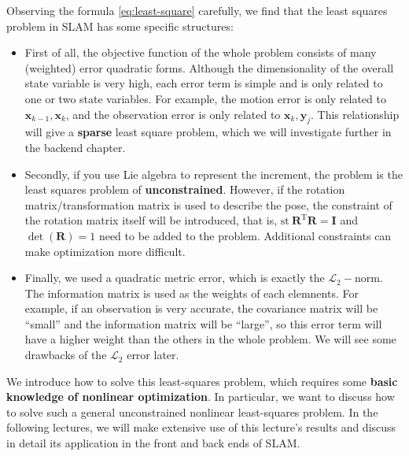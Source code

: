 Observing the formula \eqref{eq:least-square} carefully, we find that the least squares problem in SLAM has some specific structures:

\begin{itemize}
	\item First of all, the objective function of the whole problem consists of many (weighted) error quadratic forms. Although the dimensionality of the overall state variable is very high, each error term is simple and is only related to one or two state variables. For example, the motion error is only related to $\bm{x}_{k-1}, \bm{x}_k$, and the observation error is only related to $\bm{x}_k, \bm{y}_j$. This relationship will give a \textbf{sparse} least square problem, which we will investigate further in the backend chapter.

	\item Secondly, if you use Lie algebra to represent the increment, the problem is the least squares problem of \textbf{unconstrained}. However, if the rotation matrix/transformation matrix is ​​used to describe the pose, the constraint of the rotation matrix itself will be introduced, that is, $\mathrm{st}\ \bm{R}^\mathrm{T} \bm{R} = \bm{I}$ and $\det (\bm{R})=1$ need to be added to the problem. Additional constraints can make optimization more difficult. 

	\item Finally, we used a quadratic metric error, which is exactly the $\mathcal{L}_2-$norm. The information matrix is used as the weights of each elemnents. For example, if an observation is very accurate, the covariance matrix will be ``small'' and the information matrix will be ``large'', so this error term will have a higher weight than the others in the whole problem. We will see some drawbacks of the $\mathcal{L}_2$ error later.
\end{itemize}

We introduce how to solve this least-squares problem, which requires some \textbf{basic knowledge of nonlinear optimization}. In particular, we want to discuss how to solve such a general unconstrained nonlinear least-squares problem. In the following lectures, we will make extensive use of this lecture's results and discuss in detail its application in the front and back ends of SLAM.

